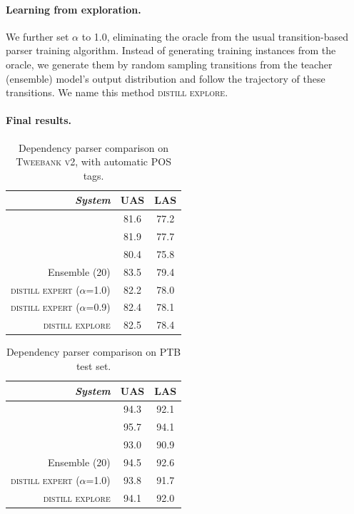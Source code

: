 \documentclass[11pt,a4paper]{article}
\begin{document}
\paragraph{Learning from exploration.} We further set $\alpha$ to 1.0,
eliminating the oracle from the usual transition-based parser
training algorithm.  Instead of generating
training instances from the oracle, we generate them by random sampling
transitions from the teacher (ensemble) model's output distribution and follow the
trajectory of these transitions. We name this method \textsc{distill explore}.

\paragraph{Final results.}
\begin{table}[t]
	\centering
	\begin{tabular}{rcc}
		\hline
		\it System & UAS & LAS \\
		\hline
		\citet{kong-EtAl:2014:EMNLP2014} &81.6 & 77.2 \\
		\citet{DBLP:journals/corr/DozatM16} & 81.9 &  77.7 \\
		\hdashline
		\newcite{ballesteros-EtAl:2016:EMNLP2016} & 80.4 & 75.8 \\
		Ensemble (20) & 83.5 & 79.4 \\
		\textsc{distill expert} ($\alpha$=1.0) & 82.2 & 78.0 \\
		\textsc{distill expert} ($\alpha$=0.9) & 82.4 & 78.1 \\		
		\textsc{distill explore} & 82.5 & 78.4 \\
		\hline
	\end{tabular}
	\caption{Dependency parser comparison on \textsc{Tweebank v2},
           with automatic POS tags. \label{tbl:parse-result}}
\end{table}

\begin{table}[t]
	\centering
	\begin{tabular}{rcc}
		\hline
		\it System & UAS & LAS \\
		\hline
		\newcite{kuncoro-16} & 94.3 & 92.1 \\
		\citet{DBLP:journals/corr/DozatM16} & 95.7 & 94.1 \\
		\hdashline
		\newcite{dyer-EtAl:2015:ACL-IJCNLP} & 93.0 & 90.9 \\		
		Ensemble (20) & 94.5 & 92.6 \\
		\textsc{distill expert} ($\alpha$=1.0) & 93.8 & 91.7 \\
		\textsc{distill explore} & 94.1 & 92.0 \\
		\hline
	\end{tabular}
	\caption{Dependency parser comparison on PTB test set.}\label{tbl:parse-result-PTB}
\end{table}
\end{document}
